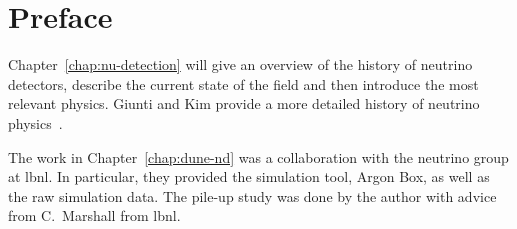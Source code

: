 \renewcommand{\Chapter}{{Preface}}
\chapter*{\Chapter}
\chaptermark{\Chapter}

Chapter~\ref{chap:nu-detection} will give an overview of the history of neutrino detectors, describe the current state of the field and then introduce the most relevant physics.
Giunti and Kim provide a more detailed history of neutrino physics~\cite{giunti}.

The work in Chapter~\ref{chap:dune-nd} was a collaboration with the neutrino group at \gls{lbnl}.
In particular, they provided the simulation tool, Argon Box, as well as the raw simulation data.
The \Pgpz pile-up study was done by the author with advice from C.\ Marshall from \gls{lbnl}.